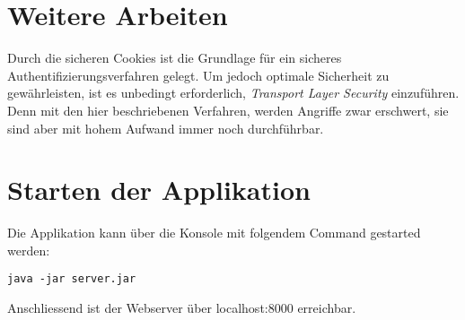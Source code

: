 \section{Weitere Arbeiten}

Durch die sicheren Cookies ist die Grundlage für ein sicheres Authentifizierungsverfahren gelegt.
Um jedoch optimale Sicherheit zu gewährleisten, ist es unbedingt erforderlich, \textit{Transport Layer Security} 
einzuführen. Denn mit den hier beschriebenen Verfahren, werden Angriffe zwar erschwert, sie sind aber
mit hohem Aufwand immer noch durchführbar.

\section{Starten der Applikation}

Die Applikation kann über die Konsole mit folgendem Command gestarted werden:
\newline
\begin{lstlisting}[caption=Start der Applikation]
java -jar server.jar 
\end{lstlisting}

Anschliessend ist der Webserver über localhost:8000 erreichbar.
